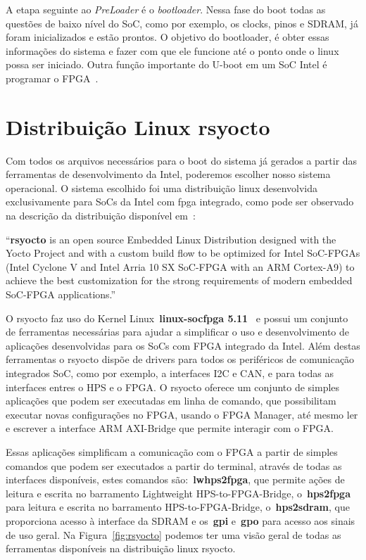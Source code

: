 A etapa seguinte ao \textit{PreLoader} é o \textit{bootloader}. Nessa fase do boot todas as questões de baixo nível do SoC, como por exemplo, os clocks, pinos e SDRAM, já foram inicializados e estão prontos. O objetivo do bootloader, é obter essas informações do sistema e fazer com que ele funcione até o ponto onde o linux possa ser iniciado. Outra função importante do U-boot em um SoC Intel é programar o FPGA~\cite{SocLinux}.

\section{Distribuição Linux rsyocto}
Com todos os arquivos necessários para o boot do sistema já gerados a partir das ferramentas de desenvolvimento da Intel, poderemos escolher nosso sistema operacional. O sistema escolhido foi uma distribuição linux desenvolvida exclusivamente para SoCs da Intel com fpga integrado, como pode ser observado na descrição da distribuição disponível em~\cite{rsyocto}:

\begin{citacao}
	``\textbf{rsyocto} is an open source Embedded Linux Distribution designed with the Yocto Project and with a custom build flow to be optimized for Intel SoC-FPGAs (Intel Cyclone V and Intel Arria 10 SX SoC-FPGA with an ARM Cortex-A9) to achieve the best customization for the strong requirements of modern embedded SoC-FPGA applications.''
\end{citacao} 

O rsyocto faz uso do Kernel Linux~\textbf{linux-socfpga 5.11}~\cite{linuxsocfpga} e possui um conjunto de ferramentas necessárias para ajudar a simplificar o uso e desenvolvimento de aplicações desenvolvidas para os SoCs com FPGA integrado da Intel. Além destas ferramentas o rsyocto dispõe de drivers para todos os periféricos de comunicação integrados SoC, como por exemplo, a interfaces I2C e CAN, e para todas as interfaces entres o HPS e o FPGA\@. O rsyocto oferece um conjunto de simples aplicações que podem ser executadas em linha de comando, que possibilitam executar novas configurações no FPGA, usando o FPGA Manager, até mesmo ler e escrever a interface ARM AXI-Bridge que permite interagir com o FPGA\@. 

Essas aplicações simplificam a comunicação com o FPGA a partir de simples comandos que podem ser executados a partir do terminal, através de todas as interfaces disponíveis, estes comandos são:~\textbf{lwhps2fpga}, que permite ações de leitura e escrita no barramento Lightweight HPS-to-FPGA-Bridge, o~\textbf{hps2fpga} para leitura e escrita no barramento HPS-to-FPGA-Bridge, o~\textbf{hps2sdram}, que proporciona acesso à interface da SDRAM e os~\textbf{gpi} e~\textbf{gpo} para acesso aos sinais de uso geral. Na Figura~\ref{fig:rsyocto} podemos ter uma visão geral de todas as ferramentas disponíveis na distribuição linux rsyocto.


